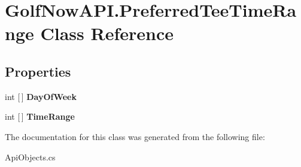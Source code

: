 \hypertarget{class_golf_now_a_p_i_1_1_preferred_tee_time_range}{}\section{Golf\+Now\+A\+P\+I.\+Preferred\+Tee\+Time\+Range Class Reference}
\label{class_golf_now_a_p_i_1_1_preferred_tee_time_range}
\subsection*{Properties}
\begin{DoxyCompactItemize}
\item 
\mbox{\label{class_golf_now_a_p_i_1_1_preferred_tee_time_range_aa665bf5a3f4ccb2eb5eb0a3c0219e0c2}} 
int \mbox{[}$\,$\mbox{]} {\bfseries Day\+Of\+Week}
\item 
\mbox{\label{class_golf_now_a_p_i_1_1_preferred_tee_time_range_a040dedbf99303e72de741d22732a0866}} 
int \mbox{[}$\,$\mbox{]} {\bfseries Time\+Range}
\end{DoxyCompactItemize}


The documentation for this class was generated from the following file\+:\begin{DoxyCompactItemize}
\item 
Api\+Objects.\+cs\end{DoxyCompactItemize}
